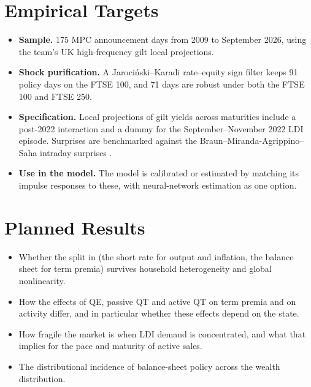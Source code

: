 \documentclass[11pt,a4paper]{article}
\begin{document}
\section{Empirical Targets}
\begin{itemize}
  \item \textbf{Sample.} 175 MPC announcement days from 2009 to September 2026, using the team's UK high-frequency gilt local projections.
  \item \textbf{Shock purification.} A Jaroci\'nski--Karadi rate--equity sign filter \citep{JarocinskiKaradi2020} keeps 91 policy days on the FTSE 100, and 71 days are robust under both the FTSE 100 and FTSE 250.
  \item \textbf{Specification.} Local projections of gilt yields across maturities include a post-2022 interaction and a dummy for the September--November 2022 LDI episode. Surprises are benchmarked against the Braun--Miranda-Agrippino--Saha intraday surprises \citep{BraunMirandaAgrippinoSaha}.
  \item \textbf{Use in the model.} The model is calibrated or estimated by matching its impulse responses to these, with neural-network estimation \citep{Kase2024} as one option.
\end{itemize}

\section{Planned Results}
\begin{itemize}
  \item Whether the split in \citet{KamdarRay2026} (the short rate for output and inflation, the balance sheet for term premia) survives household heterogeneity and global nonlinearity.
  \item How the effects of QE, passive QT and active QT on term premia and on activity differ, and in particular whether these effects depend on the state.
  \item How fragile the market is when LDI demand is concentrated, and what that implies for the pace and maturity of active sales.
  \item The distributional incidence of balance-sheet policy across the wealth distribution.
\end{itemize}
\end{document}
